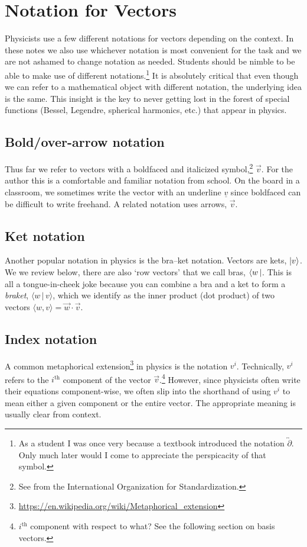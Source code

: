 \documentclass[
  11pt,
	colorful,
	raggedright,
]{tufte-style-thesis-flip}
\begin{document}
\section{Notation for Vectors}
\label{sec:vector:notation}

Physicists use a few different notations for vectors depending on the context. In these notes we also use whichever notation is most convenient for the task and we are not ashamed to change notation as needed. Students should be nimble to be able to make use of different notations.\footnote{As a student I was once very because a textbook introduced the notation $\overleftrightarrow{\partial}$. Only much later would I come to appreciate the perspicacity of that symbol.} It is absolutely critical that even though we can refer to a mathematical object with different notation, the underlying idea is the same. This insight is the key to never getting lost in the forest of special functions (Bessel, Legendre, spherical harmonics, etc.) that appear in physics.

\subsection{Bold/over-arrow notation} Thus far we refer to vectors with a boldfaced and italicized symbol,\footnote{See  from the International Organization for Standardization.} $\vec{v}$. For the author this is a comfortable and familiar notation from school. On the board in a classroom, we sometimes write the vector with an underline $\underline{v}$ since boldfaced can be difficult to write freehand. A related notation uses arrows, $\overrightarrow{v}$. %

\subsection{Ket notation} Another popular notation in physics is the bra--ket notation. Vectors are kets, $\left|v\right\rangle$. We we review below, there are also `row vectors' that we call bras, $\left\langle w\,\right|$. This is all a tongue-in-cheek joke because you can combine a bra and a ket to form a \emph{braket}, $\langle w \,|\, v\rangle$, which we identify as the inner product (dot product) of two vectors $\langle w, v\rangle = \vec{w}\cdot\vec{v}$. 

\subsection{Index notation} A common metaphorical extension\footnote{\url{https://en.wikipedia.org/wiki/Metaphorical_extension}} in physics is the notation $v^i$. Technically, $v^i$ refers to the $i^\text{th}$ component of the vector $\vec{v}$.\footnote{$i^\text{th}$ component with respect to what? See the following section on basis vectors.} However, since physicists often write their equations component-wise, we often slip into the shorthand of using $v^i$ to mean either a given component or the entire vector. The appropriate meaning is usually clear from context. 
\end{document}
